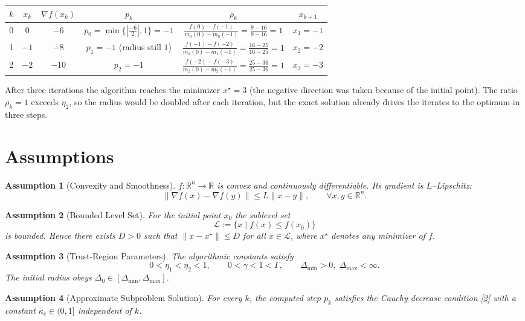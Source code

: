 \documentclass{article}
\newtheorem{assumption}{Assumption}
\begin{document}
\begin{center}
\begin{tabular}{c|c|c|c|c|c}
$k$ & $x_k$ & $\nabla f(x_k)$ & $p_k$ & $\rho_k$ & $x_{k+1}$ \\ \hline
0 & $0$ & $-6$ & $p_0= \min\{|\frac{-6}{2}|,1\}= -1$ & 
$\displaystyle\frac{f(0)-f(-1)}{m_0(0)-m_0(-1)}=
\frac{9-16}{9-16}=1$ & $x_1= -1$ \\ \hline
1 & $-1$ & $-8$ & $p_1= -1$ (radius still $1$) &
$\displaystyle\frac{f(-1)-f(-2)}{m_1(0)-m_1(-1)}=
\frac{16-25}{16-25}=1$ & $x_2=-2$ \\ \hline
2 & $-2$ & $-10$ & $p_2= -1$ &
$\displaystyle\frac{f(-2)-f(-3)}{m_2(0)-m_2(-1)}=
\frac{25-36}{25-36}=1$ & $x_3=-3$ \\ \hline
\end{tabular}
\end{center}
After three iterations the algorithm reaches the minimizer $x^{\star}=3$ (the
negative direction was taken because of the initial point).  The ratio $\rho_k=1$
exceeds $\eta_{2}$, so the radius would be doubled after each iteration, but the
exact solution already drives the iterates to the optimum in three steps.

\section*{Assumptions}
\begin{assumption}[Convexity and Smoothness]\label{as:convex}
$f:\mathbb{R}^{n}\!\to\!\mathbb{R}$ is convex and continuously differentiable.
Its gradient is $L$–Lipschitz:
\[
\|\nabla f(x)-\nabla f(y)\|\le L\|x-y\|,\qquad\forall x,y\in\mathbb{R}^{n}.
\]
\end{assumption}
\begin{assumption}[Bounded Level Set]\label{as:bounded}
For the initial point $x_{0}$ the sublevel set 
\[
\mathcal{L}:=\{x\mid f(x)\le f(x_{0})\}
\]
is bounded. Hence there exists $D>0$ such that $\|x-x^{\star}\|\le D$ for all
$x\in\mathcal{L}$, where $x^{\star}$ denotes any minimizer of $f$.
\end{assumption}
\begin{assumption}[Trust‑Region Parameters]\label{as:params}
The algorithmic constants satisfy
\[
0<\eta_{1}<\eta_{2}<1,\qquad 0<\gamma<1<\Gamma,
\qquad \Delta_{\min}>0,\;\Delta_{\max}<\infty .
\]
The initial radius obeys $\Delta_{0}\in[\Delta_{\min},\Delta_{\max}]$.
\end{assumption}
\begin{assumption}[Approximate Subproblem Solution]\label{as:cauchy}
For every $k$, the computed step $p_k$ satisfies the Cauchy decrease condition
\eqref{2} with a constant $\kappa_{\mathrm{c}}\in(0,1]$ independent of $k$.
\end{assumption}
\end{document}
